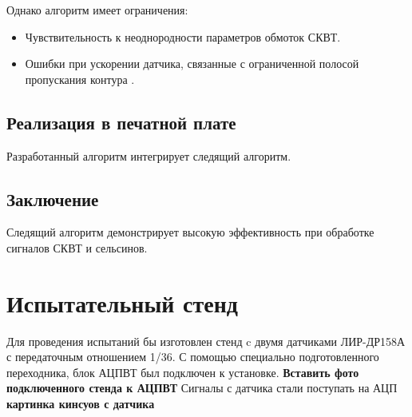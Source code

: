Однако алгоритм имеет ограничения:
\begin{itemize}
    \item Чувствительность к неоднородности параметров обмоток СКВТ.
    \item Ошибки при ускорении датчика, связанные с ограниченной полосой пропускания контура \cite{Anufriev2014}.
\end{itemize}

\subsection{Реализация в печатной плате}
Разработанный алгоритм интегрирует следящий алгоритм.

\subsection{Заключение}
Следящий алгоритм демонстрирует высокую эффективность при обработке сигналов СКВТ и сельсинов. 

\section{Испытательный стенд}

Для проведения испытаний бы изготовлен стенд c двумя датчиками ЛИР-ДР158А с передаточным отношением 1/36. 
С помощью специально подготовленного переходника, блок АЦПВТ был подключен к установке. \textbf{Вставить фото подключенного стенда к АЦПВТ}
Сигналы с датчика стали поступать на АЦП \textbf{картинка кинсуов с датчика}